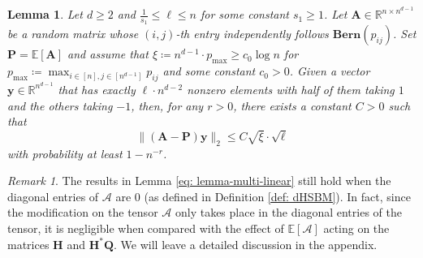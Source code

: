\documentclass{article}
\theoremstyle{plain}
\newtheorem{lemma}[theorem]{Lemma}
\theoremstyle{definition}
\theoremstyle{remark}
\newtheorem{remark}[theorem]{Remark}
\newcommand{\Br}{\mathbb{R}}
\newcommand{\BP}{\bm{P}}
\newcommand{\BA}{\bm{A}}
\newcommand{\EE}{{\mathbb{E}}}
\def\by{\bm{y}}
\begin{document}
\begin{lemma} \label{prop: concentration}
	Let $d \geq 2$ and $\frac{1}{s_1} \leq \ell \leq n$ for some constant $s_1\geq 1$. Let $\BA \in \Br^{n \times n^{d-1}}$ be a random matrix whose $(i,j)$-th entry independently follows $\mathbf{Bern}(p_{ij})$. Set $\BP = \EE[\BA]$ and assume that $\xi \coloneqq n^{d-1} \cdot p_{\max} \geq c_0 \log n$ for $p_{\max} \coloneqq \max_{i\in [n],j\in[ n^{d-1}]}p_{ij}$ and some constant $c_0 >0$. Given a vector $\by \in \Br^{n^{d-1}}$ that has exactly $\ell \cdot n^{d-2}$ nonzero elements with half of them taking $1$ and the others taking $-1$, then, for any $r >0$, there exists a constant $C>0$ such that 
	\begin{equation}\label{eq:concentration}
		\| (\BA - \BP) \by \|_2 \leq C\sqrt{\xi}\cdot \sqrt{\ell}
	\end{equation}
	with probability at least $1-n^{-r}$.
\end{lemma}

\begin{remark} \label{remark: diagonalofA}
The results in Lemma \ref{eq: lemma-multi-linear} still hold when the diagonal entries of $\mathcal{A}$ are 0 (as defined in Definition \ref{def: dHSBM}). In fact, since the modification on the tensor $\mathcal{A}$ only takes place in the diagonal entries of the tensor, it is negligible when compared with the effect of $\mathbb{E}[\mathcal{A}]$ acting on the matrices $\bm{H}$ and $\bm{H}^*\bm{Q}$. We will leave a detailed discussion in the appendix.
\end{remark}
\end{document}
